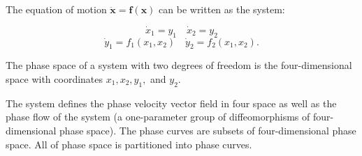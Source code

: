 The equation of motion $\ddot{\mathbf{x}} = \mathbf{f}(\mathbf{x})$ can be written as the system:

$$\dot{x}_1 = y_1 \quad \dot{x}_2 = y_2$$
$$\dot{y}_1 = f_1(x_1, x_2) \quad \dot{y}_2 = f_2(x_1, x_2).$$

The phase space of a system with two degrees of freedom is the four-dimensional space with coordinates $x_1, x_2, y_1,$ and $y_2$.

The system defines the phase velocity vector field in four space as well as the phase flow of the system (a one-parameter group of diffeomorphisms of four-dimensional phase space). The phase curves are subsets of four-dimensional phase space. All of phase space is partitioned into phase curves.
